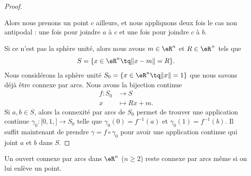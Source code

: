 \begin{proof}
\begin{subproof}
		Alors nous prenons un point \( c\) ailleurs, et nous appliquons deux fois le cas non antipodal : une fois pour joindre \( a\) à \( c\) et une fois pour joindre \( c\) à \( b\).
	\end{subproof}
	Si ce n'est pas la sphère unité, alors nous avons \( m\in \eR^n\) et \( R\in \eR^+\) tels que
	\begin{equation}
		S=\{ x\in \eR^n\tq \| x-m \|=R \}.
	\end{equation}
	Nous considérons la sphère unité \( S_0=\{ x\in \eR^n\tq\| x \|=1 \}\) que nous savons déjà être connexe par arcs. Nous avons la bijection continue
	\begin{equation}
		\begin{aligned}
			f\colon S_0 & \to S         \\
			x           & \mapsto Rx+m.
		\end{aligned}
	\end{equation}
	Si \( a,b\in S\), alors la connexité par arcs de \( S_0\) permet de trouver une application continue \(\gamma_0 \colon \mathopen[ 0,1,\mathclose]\to S_0  \) telle que \( \gamma_0(0)=f^{-1}(a)\) et \( \gamma_0(1)=f^{-1}(b)\). Il suffit maintenant de prendre \( \gamma=f\circ\gamma_0\) pour avoir une application continue qui joint \( a\) et \( b\) dans \( S\).
\end{proof}



\begin{lemma}       \label{LEMooDYNSooOmJbYq}
	Un ouvert connexe par arcs dans \( \eR^n\) (\( n \geq 2\)) reste connexe par arcs même si on lui enlève un point.
\end{lemma}

